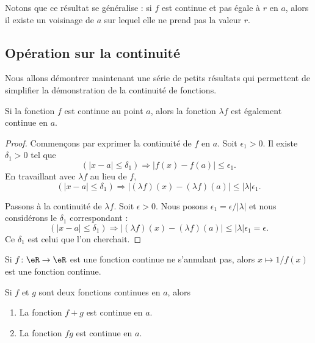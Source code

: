Notons que ce résultat se généralise : si \( f\) est continue et pas égale à \( r\) en \( a\), alors il existe un voisinage de \( a\) sur lequel elle ne prend pas la valeur \( r\).

\subsection{Opération sur la continuité}

Nous allons démontrer maintenant une série de petits résultats qui permettent de simplifier la démonstration de la continuité de fonctions.
\begin{theorem}
	Si la fonction \( f\) est continue au point \( a\), alors la fonction \( \lambda f\) est également continue en \( a\).
\end{theorem}

\begin{proof}
	Commençons par exprimer la continuité de \( f\) en \( a\). Soit \( \epsilon_1>0\). Il existe \( \delta_1>0\) tel que
	\[
		(| x-a |\leq \delta_1)\Rightarrow | f(x)-f(a) |\leq \epsilon_1.
	\]
	En travaillant avec \( \lambda f\) au lieu de \( f\),
	\begin{equation}
		(| x-a |\leq\delta_1)\Rightarrow  | (\lambda f)(x)- (\lambda f)(a)|\leq | \lambda |\epsilon_1.
	\end{equation}

	Passons à la continuité de \( \lambda f\). Soit \( \epsilon>0\). Nous posons \( \epsilon_1=\epsilon/| \lambda |\) et nous considérons le \( \delta_1\) correspondant :
	\[
		(| x-a |\leq\delta_1)\Rightarrow  | (\lambda f)(x)- (\lambda f)(a)|\leq | \lambda |\epsilon_1=\epsilon.
	\]
	Ce \( \delta_1\) est celui que l'on cherchait.
\end{proof}

\begin{proposition}	\label{PROPooBUJCooBHmKEG}
	Si \(f \colon \eR\to \eR  \) est une fonction continue ne s'annulant pas, alors \( x\mapsto 1/f(x)  \) est une fonction continue.
\end{proposition}


\begin{theorem}		\label{THOooWRXOooUvKgkQ}
	Si \( f\) et \( g\) sont deux fonctions continues en \( a\), alors
	\begin{enumerate}
		\item
		      La fonction \( f+g\) est continue en \( a\).
		\item		\label{ITEMooSHMVooZPNtCv}
		      La fonction \( fg\) est continue en \( a\).
	\end{enumerate}
\end{theorem}

